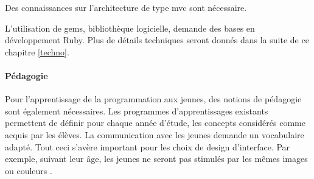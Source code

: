 Des connaissances sur l'architecture de type \gls{mvc} sont nécessaire. 

L'utilisation de gems, bibliothèque logicielle, demande des bases en développement Ruby. Plus de détails techniques seront donnés dans la suite de ce chapitre \ref{techno}. %

\paragraph{Pédagogie}

Pour l'apprentissage de la programmation aux jeunes, des notions de pédagogie sont également nécessaires.
Les programmes d'apprentissages existants permettent de définir pour chaque année d'étude, les concepts considérés comme acquis par les élèves. La communication avec les jeunes demande un vocabulaire adapté. Tout ceci s'avère important pour les choix de design d'interface. Par exemple, suivant leur âge, les jeunes ne seront pas stimulés par les mêmes images ou couleurs \cite{color}. %



